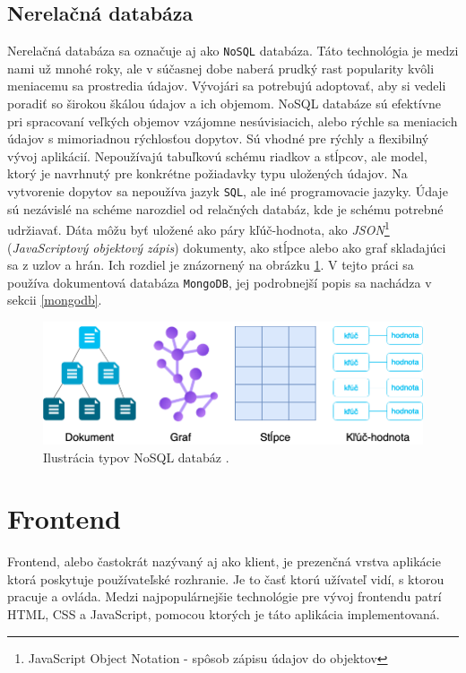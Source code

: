 \subsection{Nerelačná databáza}
Nerelačná databáza sa označuje aj ako \texttt{NoSQL}\cite{nosql} databáza. Táto technológia je medzi nami už mnohé roky, ale v súčasnej dobe naberá prudký rast popularity kvôli meniacemu sa prostredia údajov. Vývojári sa potrebujú adoptovať, aby si vedeli poradiť so širokou škálou údajov a ich objemom. NoSQL databáze sú efektívne pri spracovaní veľkých objemov vzájomne nesúvisiacich, alebo rýchle sa meniacich údajov s mimoriadnou rýchlosťou dopytov. Sú vhodné pre rýchly a flexibilný vývoj aplikácií. Nepoužívajú tabuľkovú schému riadkov a stĺpcov, ale model, ktorý je navrhnutý pre konkrétne požiadavky typu uložených údajov. Na vytvorenie dopytov sa nepoužíva jazyk \texttt{SQL}, ale iné programovacie jazyky. Údaje sú nezávislé na schéme narozdiel od relačných databáz, kde je schému potrebné udržiavať. Dáta môžu byť uložené ako páry kľúč-hodnota, ako \textit{JSON}\footnote{JavaScript Object Notation - spôsob zápisu údajov do objektov} (\textit{JavaScriptový objektový zápis}) dokumenty, ako stĺpce alebo ako graf skladajúci sa z uzlov a hrán. Ich rozdiel je znázornený na obrázku \ref{pic:nosql_types}. V tejto práci sa používa dokumentová databáza \texttt{MongoDB}, jej podrobnejší popis sa nachádza v sekcii \ref{mongodb}.

    \begin{figure}[!hbt]
        \centering
        \includegraphics[scale=0.45]{obrazky/nosql_types.png}
        \caption{Ilustrácia typov NoSQL databáz \cite{nosql}.}
        \label{pic:nosql_types}
    \end{figure}

\section{Frontend}
Frontend, alebo častokrát nazývaný aj ako klient, je prezenčná vrstva aplikácie ktorá poskytuje používateľské rozhranie. Je to časť ktorú užívateľ vidí, s ktorou pracuje a ovláda. Medzi najpopulárnejšie technológie pre vývoj frontendu patrí HTML, CSS a JavaScript, pomocou ktorých je táto aplikácia implementovaná. 

